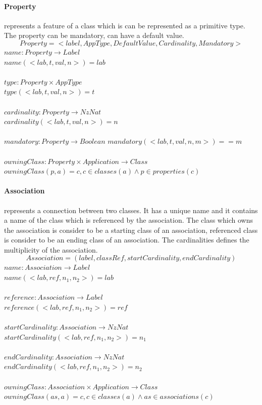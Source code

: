 \documentclass[11pt]{article}
\begin{document}
\paragraph{Property} represents a feature of  a class which is can be represented as a primitive type. The property can be mandatory, can have a default value.
$$
Property = < label, AppType, DefaultValue, Cardinality, Mandatory >
$$
$name : Property \rightarrow Label$ \\
$name(< lab, t, val, n  >) = lab$ \\ \\
$type : Property \times AppType$ \\
$type(< lab, t, val, n  >) = t$ \\ \\
$cardinality : Property \rightarrow NzNat$ \\
$cardinality(< lab, t, val, n  >) = n$ \\ \\
$mandatory : Property \rightarrow Boolean $
$mandatory(<lab, t, val, n, m >) = = m $ \\ \\
$owningClass : Property \times Application \rightarrow Class $ \\
$owningClass(p, a) = c, c \in classes(a) \wedge p \in properties(c) $

\paragraph {Association} represents a connection between two classes. It has a unique name and it contains a name of the class which is referenced by the association. The class which owns the association is consider to be a starting class of an association, referenced class is consider to be an ending class of an association. The cardinalities defines the multiplicity of the association.
$$
Association = (label, classRef, startCardinality, endCardinality)
$$
$name : Association \rightarrow Label$ \\
$name(< lab, ref, n_1, n_2  >) = lab$\\ \\
$reference : Association \rightarrow Label$ \\
$reference(< lab, ref, n_1, n_2  >) = ref$\\ \\
$startCardinality : Association \rightarrow NzNat$ \\
$startCardinality(< lab, ref, n_1, n_2  >) = n_1$\\ \\
$endCardinality : Association \rightarrow NzNat$ \\
$endCardinality(< lab, ref, n_1, n_2  >) = n_2$ \\ \\
$owningClass : Association \times Application \rightarrow Class $ \\
$owningClass(as, a) = c, c \in classes(a) \wedge as \in associations(c) $
\end{document}
